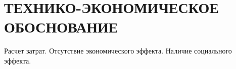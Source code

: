 \section[Технико-экономическое обоснование]{ТЕХНИКО-ЭКОНОМИЧЕСКОЕ ОБОСНОВАНИЕ}

\label{sec:teo}

Расчет затрат. Отсутствие экономического эффекта. Наличие социального эффекта.
